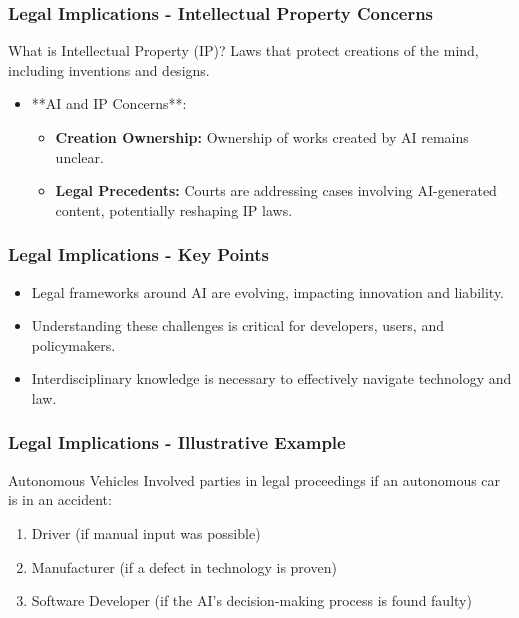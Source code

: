 \documentclass[aspectratio=169]{beamer}
\begin{document}
\begin{frame}[fragile]
    \frametitle{Legal Implications - Intellectual Property Concerns}
    \begin{block}{What is Intellectual Property (IP)?}
        Laws that protect creations of the mind, including inventions and designs.
    \end{block}

    \begin{itemize}
        \item **AI and IP Concerns**:
        \begin{itemize}
            \item \textbf{Creation Ownership:} Ownership of works created by AI remains unclear.
            \item \textbf{Legal Precedents:} Courts are addressing cases involving AI-generated content, potentially reshaping IP laws.
        \end{itemize}
    \end{itemize}
\end{frame}

\begin{frame}[fragile]
    \frametitle{Legal Implications - Key Points}
    \begin{itemize}
        \item Legal frameworks around AI are evolving, impacting innovation and liability.
        \item Understanding these challenges is critical for developers, users, and policymakers.
        \item Interdisciplinary knowledge is necessary to effectively navigate technology and law.
    \end{itemize}
\end{frame}

\begin{frame}[fragile]
    \frametitle{Legal Implications - Illustrative Example}
    \begin{block}{Autonomous Vehicles}
        Involved parties in legal proceedings if an autonomous car is in an accident:
    \end{block}
    \begin{enumerate}
        \item Driver (if manual input was possible)
        \item Manufacturer (if a defect in technology is proven)
        \item Software Developer (if the AI's decision-making process is found faulty)
    \end{enumerate}
\end{frame}
\end{document}
